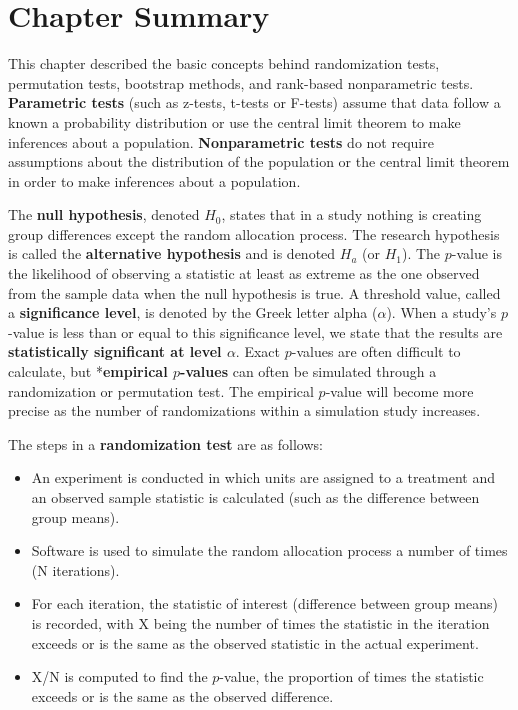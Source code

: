 \documentclass[
]{book}
\providecommand{\tightlist}{%
  \setlength{\itemsep}{0pt}\setlength{\parskip}{0pt}}
\begin{document}
\hypertarget{chapter-summary}{%
\section{Chapter Summary}\label{chapter-summary}}

This chapter described the basic concepts behind randomization tests, permutation tests, bootstrap methods, and rank-based nonparametric tests. \textbf{Parametric tests} (such as z-tests, t-tests or F-tests) assume that data follow a known a probability distribution or use the central limit theorem to make inferences about a population. \textbf{Nonparametric tests} do not require assumptions about the distribution of the population or the central limit theorem in order to make inferences about a population.

The \textbf{null hypothesis}, denoted \(H_0\), states that in a study nothing is creating group differences except the random allocation process. The research hypothesis is called the \textbf{alternative hypothesis} and is denoted \(H_a\) (or \(H_1\)). The \(p\)-value is the likelihood of observing a statistic at least as extreme as the one observed from the sample data when the null hypothesis is true. A threshold value, called a \textbf{significance level}, is denoted by the Greek letter alpha (\(\alpha\)). When a study's \(p\)-value is less than or equal to this significance level, we state that the results are \textbf{statistically significant at level \(\alpha\)}. Exact \(p\)-values are often difficult to calculate, but *\textbf{empirical \(p\)-values} can often be simulated through a randomization or permutation test. The empirical \(p\)-value will become more precise as the number of randomizations within a simulation study
increases.

The steps in a \textbf{randomization test} are as follows:

\begin{itemize}
\tightlist
\item
  An experiment is conducted in which units are assigned to a treatment and an observed sample statistic is calculated (such as the difference between group means).
\item
  Software is used to simulate the random allocation process a number of times (N iterations).
\item
  For each iteration, the statistic of interest (difference between group means) is recorded, with X being
  the number of times the statistic in the iteration exceeds or is the same as the observed statistic in the
  actual experiment.
\item
  X/N is computed to find the \(p\)-value, the proportion of times the statistic exceeds or is the same as the
  observed difference.
\end{itemize}
\end{document}
